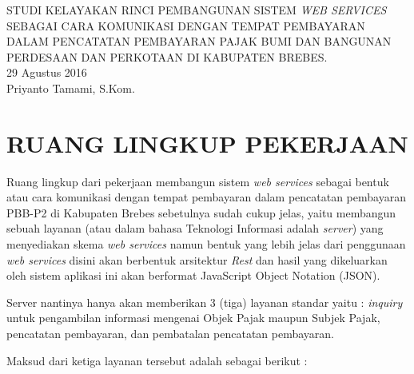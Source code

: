 \documentclass[pdftex,12pt, oneside]{article}
\begin{document}
\sloppy %

\begin{center}
{\large STUDI KELAYAKAN RINCI PEMBANGUNAN SISTEM \textit{WEB SERVICES} SEBAGAI CARA KOMUNIKASI DENGAN TEMPAT PEMBAYARAN DALAM PENCATATAN PEMBAYARAN PAJAK BUMI DAN BANGUNAN PERDESAAN DAN PERKOTAAN DI KABUPATEN BREBES.}
\\[1cm]
29 Agustus 2016\\
Priyanto Tamami, S.Kom.
\end{center}




\section{RUANG LINGKUP PEKERJAAN}

Ruang lingkup dari pekerjaan membangun sistem \textit{web services} sebagai bentuk atau cara komunikasi dengan tempat pembayaran dalam pencatatan pembayaran PBB-P2 di Kabupaten Brebes sebetulnya sudah cukup jelas, yaitu membangun sebuah layanan (atau dalam bahasa Teknologi Informasi adalah \textit{server}) yang menyediakan skema \textit{web services} namun bentuk yang lebih jelas dari penggunaan \textit{web services} disini akan berbentuk arsitektur \textit{Rest} dan hasil yang dikeluarkan oleh sistem aplikasi ini akan berformat JavaScript Object Notation (JSON).

Server nantinya hanya akan memberikan 3 (tiga) layanan standar yaitu : \textit{inquiry} untuk pengambilan informasi mengenai Objek Pajak maupun Subjek Pajak, pencatatan pembayaran, dan pembatalan pencatatan pembayaran.

Maksud dari ketiga layanan tersebut adalah sebagai berikut :
\end{document}
